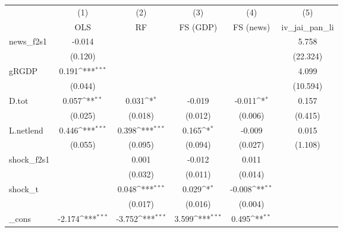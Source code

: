 {
\def\sym#1{\ifmmode^{#1}\else\(^{#1}\)\fi}
\begin{tabular}{l*{5}{c}}
\toprule
            &\multicolumn{1}{c}{(1)}&\multicolumn{1}{c}{(2)}&\multicolumn{1}{c}{(3)}&\multicolumn{1}{c}{(4)}&\multicolumn{1}{c}{(5)}\\
            &\multicolumn{1}{c}{OLS}&\multicolumn{1}{c}{RF}&\multicolumn{1}{c}{FS (GDP)}&\multicolumn{1}{c}{FS (news)}&\multicolumn{1}{c}{iv\_jai\_pan\_li}\\
\midrule
news\_f2s1   &      -0.014         &                     &                     &                     &       5.758         \\
            &     (0.120)         &                     &                     &                     &    (22.324)         \\
\addlinespace
gRGDP       &       0.191\sym{***}&                     &                     &                     &       4.099         \\
            &     (0.044)         &                     &                     &                     &    (10.594)         \\
\addlinespace
D.tot       &       0.057\sym{**} &       0.031\sym{*}  &      -0.019         &      -0.011\sym{*}  &       0.157         \\
            &     (0.025)         &     (0.018)         &     (0.012)         &     (0.006)         &     (0.415)         \\
\addlinespace
L.netlend   &       0.446\sym{***}&       0.398\sym{***}&       0.165\sym{*}  &      -0.009         &       0.015         \\
            &     (0.055)         &     (0.095)         &     (0.094)         &     (0.027)         &     (1.108)         \\
\addlinespace
shock\_f2s1  &                     &       0.001         &      -0.012         &       0.011         &                     \\
            &                     &     (0.032)         &     (0.011)         &     (0.014)         &                     \\
\addlinespace
shock\_t     &                     &       0.048\sym{***}&       0.029\sym{*}  &      -0.008\sym{**} &                     \\
            &                     &     (0.017)         &     (0.016)         &     (0.004)         &                     \\
\addlinespace
\_cons      &      -2.174\sym{***}&      -3.752\sym{***}&       3.599\sym{***}&       0.495\sym{**} &                     \\

\end{tabular}}
